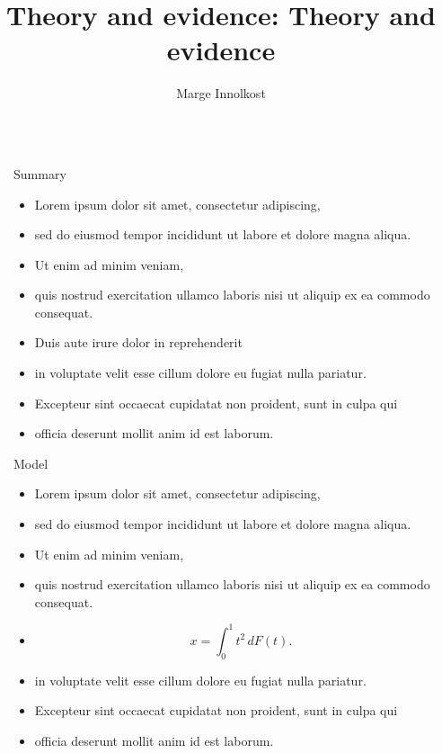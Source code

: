 \documentclass[12pt, final]{beamer}
\title{Theory and evidence: Theory and evidence}
\author{Marge Innolkost}
\newlength{\sepwid}
\newlength{\onecolwid}
\begin{document}
\begin{frame}[t]
  \begin{columns}[t]
    \begin{column}{\sepwid}\end{column} %
    \begin{column}{\onecolwid}
      \begin{block}{Summary}
        \begin{itemize}
          \item Lorem ipsum \alert{dolor} sit amet, consectetur adipiscing,
          \item sed do eiusmod tempor incididunt ut labore et dolore magna aliqua.
          \item Ut enim ad minim veniam,
          \item quis nostrud exercitation ullamco laboris nisi ut aliquip ex ea commodo consequat.
          \item Duis aute irure dolor in reprehenderit
          \item in voluptate velit \alert{esse cillum dolore} eu fugiat nulla pariatur.
          \item Excepteur sint occaecat cupidatat non proident, sunt in culpa qui
          \item officia deserunt mollit anim id est laborum.
        \end{itemize}
      \end{block}
      \begin{block}{Model}
        \begin{itemize}
          \item Lorem ipsum \alert{dolor} sit amet, consectetur adipiscing,
          \item sed do eiusmod tempor incididunt ut labore et dolore magna aliqua.
          \item Ut enim ad minim veniam,
          \item quis nostrud exercitation ullamco laboris nisi ut aliquip ex ea commodo consequat.
          \item $$x = \int_0^1 t^2 \,dF(t).$$
          \item in voluptate velit \alert{esse cillum dolore} eu fugiat nulla pariatur.
          \item Excepteur sint occaecat cupidatat non proident, sunt in culpa qui
          \item officia deserunt mollit anim id est laborum.
        \end{itemize}

\end{block}
\end{column}
\end{columns}
\end{frame}
\end{document}
